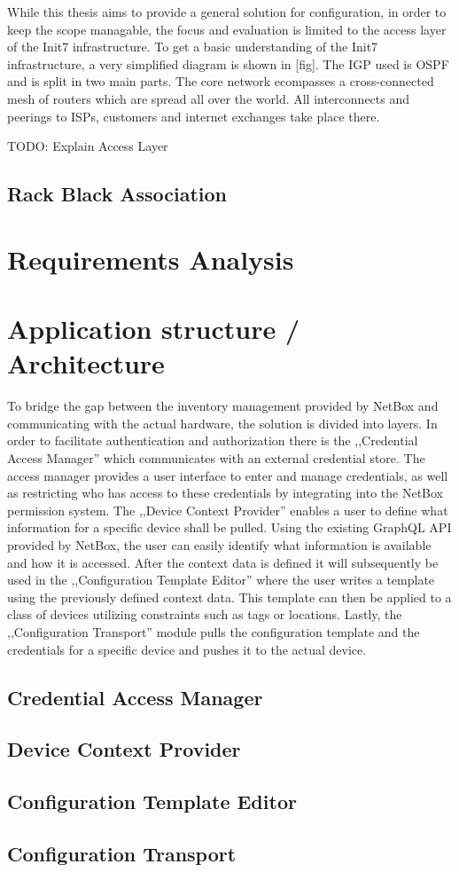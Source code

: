 While this thesis aims to provide a general solution for configuration, in order to keep the scope managable, the focus
and evaluation is limited to the access layer of the Init7 infrastructure.
To get a basic understanding of the Init7 infrastructure, a very simplified diagram is shown in [fig]. The \acrfull{IGP} used is
\acrshort{OSPF} and is split in two main parts. The core network ecompasses a cross-connected mesh of routers which are spread all
over the world. All interconnects and peerings to ISPs, customers and internet exchanges take place there. 

TODO: Explain Access Layer

\subsection{Rack Black Association}



\section{Requirements Analysis}

\section{Application structure / Architecture}

To bridge the gap between the inventory management provided by NetBox and communicating with the actual hardware,
the solution is divided into layers.
In order to facilitate authentication and authorization there is the ,,Credential Access Manager'' which communicates
with an external credential store. The access manager provides a user interface to enter and manage credentials, as well
as restricting who has access to these credentials by integrating into the NetBox permission system.
The ,,Device Context Provider'' enables a user to define what information for a specific device shall be pulled.
Using the existing GraphQL API provided by NetBox, the user can easily identify what information is available and how it is
accessed. After the context data is defined it will subsequently be used in the ,,Configuration Template Editor''
where the user writes a template using the previously defined context data. This template can then be applied to
a class of devices utilizing constraints such as tags or locations.
Lastly, the ,,Configuration Transport'' module pulls the configuration template and the credentials for a specific device
and pushes it to the actual device.

\subsection{Credential Access Manager}



\subsection{Device Context Provider}

\subsection{Configuration Template Editor}

\subsection{Configuration Transport}
